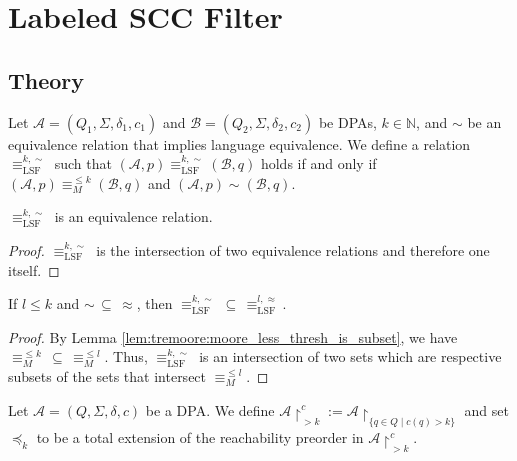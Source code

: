 \chapter{Labeled SCC Filter}
\label{chap:lsf}

\section{Theory}

\begin{defn}
	Let $\mathcal{A} = (Q_1, \Sigma, \delta_1, c_1)$ and $\mathcal{B} = (Q_2, \Sigma, \delta_2, c_2)$ be DPAs, $k \in \mathbb{N}$, and $\sim$ be an equivalence relation that implies language equivalence. We define a relation $\equiv_\text{LSF}^{k,\sim}$ such that $(\mathcal{A}, p) \equiv_\text{LSF}^{k,\sim} (\mathcal{B}, q)$ holds if and only if $(\mathcal{A}, p) \equiv_M^{\leq k} (\mathcal{B}, q)$ and $(\mathcal{A}, p) \sim (\mathcal{B}, q)$.
\end{defn}

\begin{lem}
	$\equiv_\text{LSF}^{k,\sim}$ is an equivalence relation.
\end{lem}

\begin{proof}
	$\equiv_\text{LSF}^{k,\sim}$ is the intersection of two equivalence relations and therefore one itself.
\end{proof}

\begin{lem}
	If $l \leq k$ and $\sim \,\subseteq\, \approx$, then $\equiv_\text{LSF}^{k,\sim} \,\subseteq\, \equiv_\text{LSF}^{l,\approx}$.
\end{lem}

\begin{proof}
	By Lemma \ref{lem:tremoore:moore_less_thresh_is_subset}, we have $\equiv_M^{\leq k} \,\subseteq\, \equiv_M^{\leq l}$. Thus, $\equiv_\text{LSF}^{k,\sim}$ is an intersection of two sets which are respective subsets of the sets that intersect $\equiv_M^{\leq l}$.
\end{proof}

\begin{defn}
	Let $\mathcal{A} = (Q, \Sigma, \delta, c)$ be a DPA. We define $\mathcal{A}\upharpoonright^c_{> k} := \mathcal{A}\upharpoonright_{\{q \in Q \mid c(q) > k\}}$ and set $\preceq_k$ to be a total extension of the reachability preorder in $\mathcal{A}\upharpoonright^c_{> k}$.
\end{defn}

